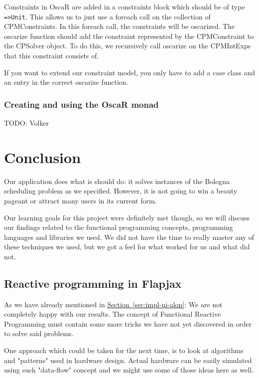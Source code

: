 \documentclass[a4paper]{article}
\begin{document}
Constraints in OscaR are added in a constraints block which should be of type
\verb|=>Unit|.
This allows us to just use a foreach call on the collection of CPMConstraints.
In this foreach call, the constraints will be oscarized.
The oscarize function should add the constraint represented by the CPMConstraint
to the CPSolver object.
To do this, we recursively call oscarize on the CPMIntExps
that this constraint consists of.

If you want to extend our constraint model,
you only have to add a case class and an entry in the correct oscarize function.


\subsubsection{Creating and using the OscaR monad}
{\Large TODO:} Volker



\section{Conclusion}
\label{sec:conclusion}
Our application does what is should do:
it solves instances of the Bologna scheduling problem as we specified.
However, it is not going to win a beauty pageant or attract many users in its 
current form.

Our learning goals for this project were definitely met though,
so we will discuss our findings related to the functional programming concepts,
programming languages and libraries we used.
We did not have the time to really master any of these techniques we used,
but we got a feel for what worked for us and what did not.

\subsection{Reactive programming in Flapjax}
As we have already mentioned in 
\hyperref[sec:impl-ui-alon]{Section~\ref*{sec:impl-ui-alon}}:
We are not completely happy with our results.
The concept of Functional Reactive Programming must contain some more tricks we
have not yet discovered in order to solve said problems. 

One approach which could
be taken for the next time, is to look at algorithms and "patterns" used in hardware
design. Actual hardware can be easily simulated using such "data-flow" concept
and we might use some of those ideas here as well.
\end{document}
